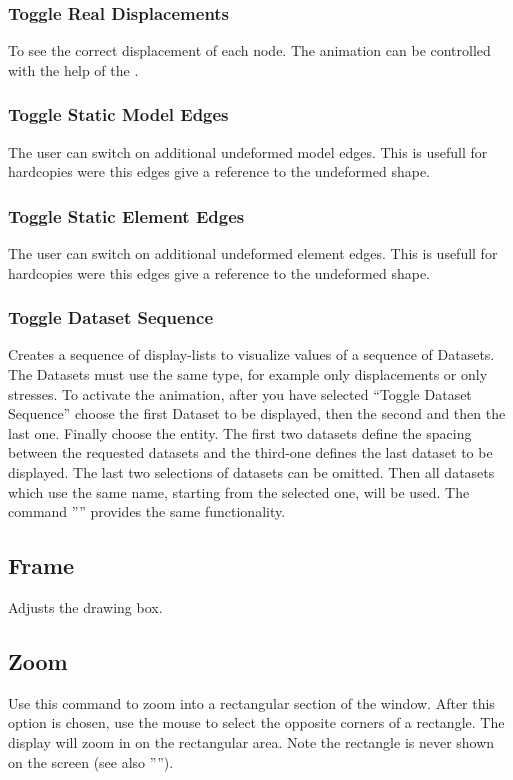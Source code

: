 \documentclass{article}
\begin{document}
\subsubsection{\label{Toggle Real Displacements}Toggle Real Displacements}
To see the correct displacement of each node. The animation can be controlled with the help of the .

\subsubsection{\label{Toggle Static Model Edges}Toggle Static Model Edges}
The user can switch on additional undeformed model edges. This is usefull for hardcopies were this edges give a reference to the undeformed shape.

\subsubsection{\label{Toggle Static Element Edges}Toggle Static Element Edges}
The user can switch on additional undeformed element edges. This is usefull for hardcopies were this edges give a reference to the undeformed shape.

\subsubsection{\label{Toggle Dataset Sequence}Toggle Dataset Sequence}
Creates a sequence of display-lists to visualize values of a sequence of Datasets. The Datasets must use the same type, for example only displacements or only stresses. To activate the animation, after you have selected ``Toggle Dataset Sequence'' choose the first Dataset to be displayed, then the second  and then the last one. Finally choose the entity. The first two datasets define the spacing between the requested datasets and the third-one defines the last dataset to be displayed. The last two selections of datasets can be omitted. Then all datasets which use the same name, starting from the selected one, will be used. The command '''' provides the same functionality. 

\subsection{\label{Frame}Frame}
Adjusts the drawing box.

\subsection{\label{Zoom}Zoom}
Use this command to zoom into a rectangular section of the window. After this option is chosen, use the mouse to select the opposite corners of a rectangle.  The display will zoom in on the rectangular area.  Note the rectangle is never shown on the screen (see also '''').
\end{document}
